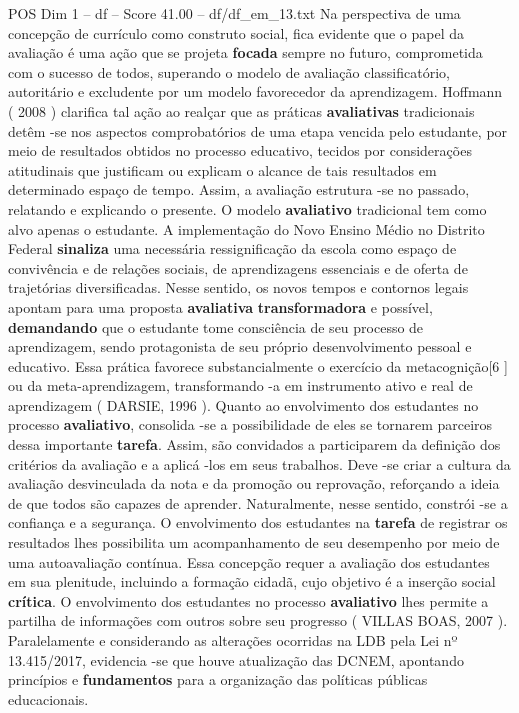 \begin{textsample}{POS Dim 1 – df – Score 41.00 – df/df\_em\_13.txt}
Na perspectiva de uma concepção de currículo como construto social, fica evidente que o papel da avaliação é uma ação que se projeta \textbf{focada} sempre no futuro, comprometida com o sucesso de todos, superando o modelo de avaliação classificatório, autoritário e excludente por um modelo favorecedor da aprendizagem.
Hoffmann ( 2008 ) clarifica tal ação ao realçar que as práticas \textbf{avaliativas} tradicionais detêm -se nos aspectos comprobatórios de uma etapa vencida pelo estudante, por meio de resultados obtidos no processo educativo, tecidos por considerações atitudinais que justificam ou explicam o alcance de tais resultados em determinado espaço de tempo.
Assim, a avaliação estrutura -se no passado, relatando e explicando o presente.
O modelo \textbf{avaliativo} tradicional tem como alvo apenas o estudante.
A implementação do Novo Ensino Médio no Distrito Federal \textbf{sinaliza} uma necessária ressignificação da escola como espaço de convivência e de relações sociais, de aprendizagens essenciais e de oferta de trajetórias diversificadas.
Nesse sentido, os novos tempos e contornos legais apontam para uma proposta \textbf{avaliativa} \textbf{transformadora} e possível, \textbf{demandando} que o estudante tome consciência de seu processo de aprendizagem, sendo protagonista de seu próprio desenvolvimento pessoal e educativo.
Essa prática favorece substancialmente o exercício da metacognição[6 ] ou da meta-aprendizagem, transformando -a em instrumento ativo e real de aprendizagem ( DARSIE, 1996 ).
Quanto ao envolvimento dos estudantes no processo \textbf{avaliativo}, consolida -se a possibilidade de eles se tornarem parceiros dessa importante \textbf{tarefa}.
Assim, são convidados a participarem da definição dos critérios da avaliação e a aplicá -los em seus trabalhos.
Deve -se criar a cultura da avaliação desvinculada da nota e da promoção ou reprovação, reforçando a ideia de que todos são capazes de aprender.
Naturalmente, nesse sentido, constrói -se a confiança e a segurança.
O envolvimento dos estudantes na \textbf{tarefa} de registrar os resultados lhes possibilita um acompanhamento de seu desempenho por meio de uma autoavaliação contínua.
Essa concepção requer a avaliação dos estudantes em sua plenitude, incluindo a formação cidadã, cujo objetivo é a inserção social \textbf{crítica}.
O envolvimento dos estudantes no processo \textbf{avaliativo} lhes permite a partilha de informações com outros sobre seu progresso ( VILLAS BOAS, 2007 ).
Paralelamente e considerando as alterações ocorridas na LDB pela Lei nº 13.415/2017, evidencia -se que houve atualização das DCNEM, apontando princípios e \textbf{fundamentos} para a organização das políticas públicas educacionais.

\end{textsample}
